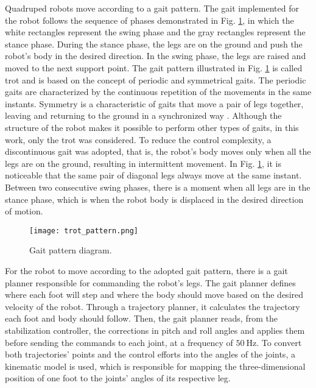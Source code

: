 \documentclass[conference]{IEEEtran}
\begin{document}
Quadruped robots move according to a gait pattern. The gait implemented for the robot follows the sequence of phases demonstrated in Fig. \ref{fig:trot_pattern}, in which the white rectangles represent the swing phase and the gray rectangles represent the stance phase. During the stance phase, the legs are on the ground and push the robot's body in the desired direction. In the swing phase, the legs are raised and moved to the next support point. The gait pattern illustrated in Fig. \ref{fig:trot_pattern} is called trot and is based on the concept of periodic and symmetrical gaits. The periodic gaits are characterized by the continuous repetition of the movements in the same instants. Symmetry is a characteristic of gaits that move a pair of legs together, leaving and returning to the ground in a synchronized way \cite{de2006quadrupedal}. Although the structure of the robot makes it possible to perform other types of gaits, in this work, only the trot was considered. To reduce the control complexity, a discontinuous gait was adopted, that is, the robot's body moves only when all the legs are on the ground, resulting in intermittent movement. In Fig. \ref{fig:trot_pattern}, it is noticeable that the same pair of diagonal legs always move at the same instant. Between two consecutive swing phases, there is a moment when all legs are in the stance phase, which is when the robot body is displaced in the desired direction of motion.

\begin{figure}[b]
  \vspace{-\baselineskip}
  \centering
  \texttt{[image: trot\_pattern.png]}
  \vfill
  \caption{Gait pattern diagram.}
  \label{fig:trot_pattern}
\end{figure}

For the robot to move according to the adopted gait pattern, there is a gait planner responsible for commanding the robot's legs. The gait planner defines where each foot will step and where the body should move based on the desired velocity of the robot. Through a trajectory planner, it calculates the trajectory each foot and body should follow. Then, the gait planner reads, from the stabilization controller, the corrections in pitch and roll angles and applies them before sending the commands to each joint, at a frequency of $\SI{50}{\hertz}$. To convert both trajectories' points and the control efforts into the angles of the joints, a kinematic model is used, which is responsible for mapping the three-dimensional position of one foot to the joints' angles of its respective leg.
\end{document}
